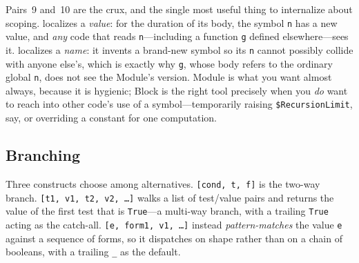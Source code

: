 Pairs~9 and~10 are the crux, and the single most useful thing to internalize
about scoping.  localizes a \emph{value}: for the duration of its body,
the symbol \texttt{n} has a new value, and \emph{any} code that reads
\texttt{n}---including a function \texttt{g} defined elsewhere---sees it. 
localizes a \emph{name}: it invents a brand-new symbol so its \texttt{n} cannot
possibly collide with anyone else's, which is exactly why \texttt{g}, whose body
refers to the ordinary global \texttt{n}, does not see the Module's version.
Module is what you want almost always, because it is hygienic; Block is the right
tool precisely when you \emph{do} want to reach into other code's use of a symbol---temporarily
raising \texttt{\$RecursionLimit}, say, or overriding a constant for one
computation.



\subsection{Branching}
\label{ssec:prog-branching}

Three constructs choose among alternatives. \texttt{[cond, t, f]} is the
two-way branch. \texttt{[t1, v1, t2, v2, \ldots]} walks a list of
test/value pairs and returns the value of the first test that is \texttt{True}---a
multi-way branch, with a trailing \texttt{True} acting as the catch-all.
\texttt{[e, form1, v1, \ldots]} instead \emph{pattern-matches} the
value \texttt{e} against a sequence of forms, so it dispatches on shape rather
than on a chain of booleans, with a trailing \texttt{\_} as the default.

